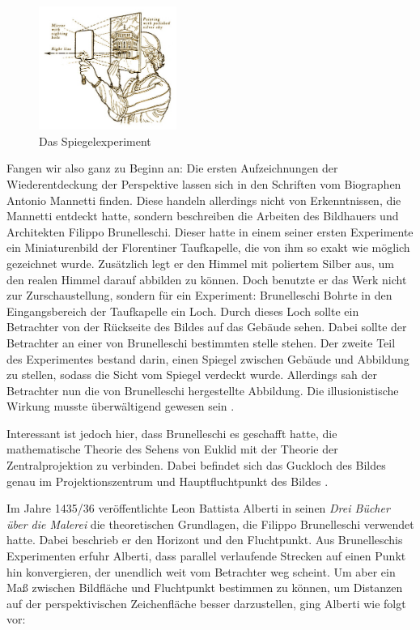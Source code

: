 \documentclass[12pt,a4paper]{article}
\begin{document}
\begin{figure}
\centering
\includegraphics[width=0.4\textwidth]{Bilder/Brunelleschi-Zentralperspektive.jpg}
\caption{Das  Spiegelexperiment}%
\label{fig:brunnelli1}
\end{figure}

Fangen wir also ganz zu Beginn an: Die ersten Aufzeichnungen der Wiederentdeckung der Perspektive lassen sich in den Schriften vom Biographen Antonio Mannetti finden. Diese handeln allerdings nicht von Erkenntnissen, die Mannetti entdeckt hatte, sondern beschreiben die Arbeiten des Bildhauers und Architekten Filippo Brunelleschi. Dieser hatte in einem seiner ersten Experimente ein Miniaturenbild der Florentiner Taufkapelle, die von ihm so exakt wie möglich gezeichnet wurde. Zusätzlich legt er den Himmel mit poliertem Silber aus, um den realen Himmel darauf abbilden zu können. Doch benutzte er das Werk nicht zur Zurschaustellung, sondern für ein Experiment: Brunelleschi Bohrte in den Eingangsbereich der Taufkapelle ein Loch. Durch dieses Loch sollte ein Betrachter von der Rückseite des Bildes auf das Gebäude sehen. Dabei sollte der Betrachter an einer von Brunelleschi bestimmten stelle stehen. Der zweite Teil des Experimentes bestand darin, einen Spiegel zwischen Gebäude und Abbildung zu stellen, sodass die Sicht vom Spiegel verdeckt wurde. Allerdings sah der Betrachter nun die von Brunelleschi hergestellte Abbildung. Die illusionistische Wirkung musste überwältigend gewesen sein \citep[S.~28f]{perspektive}.

Interessant ist jedoch hier, dass Brunelleschi es geschafft hatte, die mathematische Theorie des Sehens von Euklid mit der Theorie der Zentralprojektion zu verbinden. Dabei befindet sich das Guckloch des Bildes genau im Projektionszentrum und Hauptfluchtpunkt des Bildes \citep[S.~30]{perspektive}.

Im Jahre 1435/36 veröffentlichte Leon Battista Alberti in seinen \textit{Drei Bücher über die Malerei} die theoretischen Grundlagen, die Filippo Brunelleschi verwendet hatte. Dabei beschrieb er den Horizont und den Fluchtpunkt. Aus Brunelleschis Experimenten erfuhr Alberti, dass parallel verlaufende Strecken auf einen Punkt hin konvergieren, der unendlich weit vom Betrachter weg scheint. Um aber ein Maß zwischen Bildfläche und Fluchtpunkt bestimmen zu können, um Distanzen auf der perspektivischen Zeichenfläche besser darzustellen, ging Alberti wie folgt vor:
\end{document}
